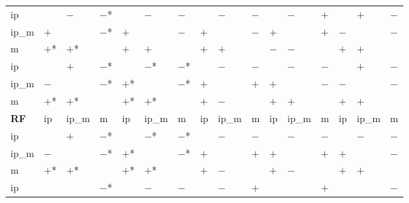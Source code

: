 \begin{table}[htbp]
{\begin{tabular}{l|lll|lll|lll|lll|lll}
\hline
ip           &            & $-$        & $-$*       &            & $-$        & $-$        &            & $-$        & $-$        &            & $-$        & $+$        &            & $+$        & $-$         \\
ip\_m        & $+$        &            & $-$*       & $+$        &            & $-$        & $+$        &            & $-$        & $+$        &            & $+$        & $-$        &            & $-$         \\
m            & $+$*       & $+$*       &            & $+$        & $+$        &            & $+$        & $+$        &            & $-$        & $-$        &            & $+$        & $+$        &             \\
\hline
\hline
ip           &            & $+$        & $-$*       &            & $-$*       & $-$*       &            & $-$        & $-$        &            & $-$        & $-$        &            & $+$        & $-$         \\
ip\_m        & $-$        &            & $-$*       & $+$*       &            & $-$*       & $+$        &            & $+$        & $+$        &            & $-$        & $-$        &            & $-$         \\
m            & $+$*       & $+$*       &            & $+$*       & $+$*       &            & $+$        & $-$        &            & $+$        & $+$        &            & $+$        & $+$        &             \\
\hline
\textbf{RF}  & ip         & ip\_m      & m          & ip         & ip\_m      & m          & ip         & ip\_m      & m          & ip         & ip\_m      & m          & ip         & ip\_m      & m           \\
\hline
ip           &            & $+$        & $-$*       &            & $-$*       & $-$*       &            & $-$        & $-$        &            & $-$        & $-$        &            & $-$        & $-$         \\
ip\_m        & $-$        &            & $-$*       & $+$*       &            & $-$*       & $+$        &            & $+$        & $+$        &            & $+$        & $+$        &            & $-$         \\
m            & $+$*       & $+$*       &            & $+$*       & $+$*       &            & $+$        & $-$        &            & $+$        & $-$        &            & $+$        & $+$        &             \\
\hline
\hline
ip           &            &            & $-$*       &            & $-$        & $-$        &            & $-$        & $+$        &            &            & $+$        &            &            & $-$         \\

\end{tabular}}
\end{table}
